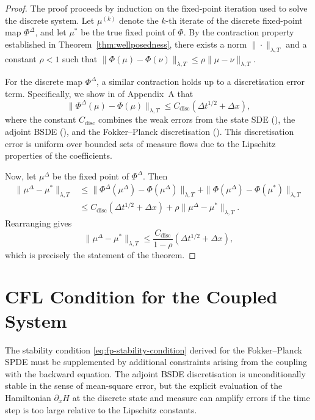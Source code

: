 \begin{proof}
The proof proceeds by induction on the fixed-point iteration used to solve the
discrete system. Let $\mu^{(k)}$ denote the $k$-th iterate of the discrete fixed-point
map $\Phi^\Delta$, and let $\mu^*$ be the true fixed point of $\Phi$. By the
contraction property established in Theorem~\ref{thm:wellposedness}, there exists a
norm $\|\cdot\|_{\lambda,T}$ and a constant $\rho < 1$ such that
$\|\Phi(\mu) - \Phi(\nu)\|_{\lambda,T} \leq \rho \|\mu - \nu\|_{\lambda,T}$.

For the discrete map $\Phi^\Delta$, a similar contraction holds up to a
discretisation error term. Specifically, we show in 
of Appendix~A that
\[
    \|\Phi^\Delta(\mu) - \Phi(\mu)\|_{\lambda,T} \leq C_{\mathrm{disc}}(\Delta t^{1/2}
    + \Delta x),
\]
where the constant $C_{\mathrm{disc}}$ combines the weak errors from the state SDE
(), the adjoint BSDE (), and
the Fokker--Planck discretisation (). This discretisation
error is uniform over bounded sets of measure flows due to the Lipschitz properties of
the coefficients.

Now, let $\mu^\Delta$ be the fixed point of $\Phi^\Delta$. Then
\begin{align*}
    \|\mu^\Delta - \mu^*\|_{\lambda,T} &\leq \|\Phi^\Delta(\mu^\Delta) -
        \Phi(\mu^\Delta)\|_{\lambda,T} + \|\Phi(\mu^\Delta) -
        \Phi(\mu^*)\|_{\lambda,T} \\
    &\leq C_{\mathrm{disc}}(\Delta t^{1/2} + \Delta x) + \rho \|\mu^\Delta -
        \mu^*\|_{\lambda,T}.
\end{align*}
Rearranging gives
\[
    \|\mu^\Delta - \mu^*\|_{\lambda,T} \leq \frac{C_{\mathrm{disc}}}{1-\rho}
    (\Delta t^{1/2} + \Delta x),
\]
which is precisely the statement of the theorem.
\end{proof}


\section{CFL Condition for the Coupled System}
\label{sec:na-cfl}

The stability condition \eqref{eq:fp-stability-condition} derived for the
Fokker--Planck SPDE must be supplemented by additional constraints arising from the
coupling with the backward equation. The adjoint BSDE discretisation is
unconditionally stable in the sense of mean-square error, but the explicit evaluation
of the Hamiltonian $\partial_x H$ at the discrete state and measure can amplify errors
if the time step is too large relative to the Lipschitz constants.

